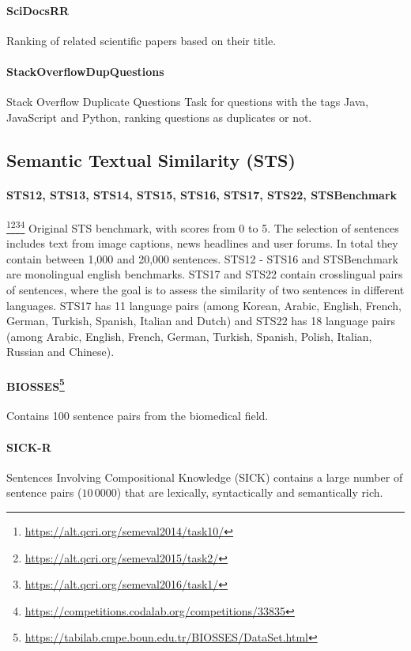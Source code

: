 \documentclass[11pt]{article}
\begin{document}
\paragraph{SciDocsRR} \cite{cohan2020scidocs} Ranking of related scientific papers based on their title.

\paragraph{StackOverflowDupQuestions} \cite{liu2018linkso} Stack Overflow Duplicate Questions Task for questions with the tags Java, JavaScript and Python, ranking questions as duplicates or not.

\subsection{Semantic Textual Similarity (STS)}

\paragraph{STS12, STS13, STS14, STS15, STS16, STS17, STS22, STSBenchmark} \cite{agirre2012semeval, agirre2013sem}\footnote{\url{https://alt.qcri.org/semeval2014/task10/}}\footnote{\url{https://alt.qcri.org/semeval2015/task2/}}\footnote{\url{https://alt.qcri.org/semeval2016/task1/}}\footnote{\url{https://competitions.codalab.org/competitions/33835}} Original STS benchmark, with scores from 0 to 5. The selection of sentences includes text from image captions, news headlines and user forums. In total they contain between 1,000 and 20,000 sentences. STS12 - STS16 and STSBenchmark are monolingual english benchmarks. STS17 and STS22 contain crosslingual pairs of sentences, where the goal is to assess the similarity of two sentences in different languages. STS17 has 11 language pairs (among Korean, Arabic, English, French, German, Turkish, Spanish, Italian and Dutch) and STS22 has 18 language pairs (among Arabic, English, French, German, Turkish, Spanish, Polish, Italian, Russian and Chinese).

\paragraph{BIOSSES\footnote{\url{https://tabilab.cmpe.boun.edu.tr/BIOSSES/DataSet.html}}} Contains 100 sentence pairs from the biomedical field.

\paragraph{SICK-R} \cite{agirre2014semeval} Sentences Involving Compositional Knowledge (SICK) contains a large number of sentence pairs ($10\,0000$) that are lexically, syntactically and semantically rich.
\end{document}
